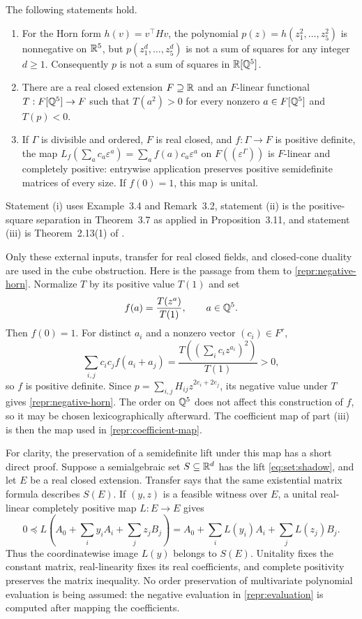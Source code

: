 \begin{lemma}
\label{repr:bkt-input}
The following statements hold.
\begin{enumerate}[label=(\roman*)]
\item For the Horn form $h(v)=v^\top Hv$, the polynomial
      $p(z)=h(z_1^2,\ldots,z_5^2)$ is nonnegative on $\mathbb R^5$, but
      $p(z_1^d,\ldots,z_5^d)$ is not a sum of squares for any integer $d\geq1$.
      Consequently $p$ is not a sum of squares in $\mathbb R[\mathbb Q^5]$.
\item There are a real closed extension $F\supseteq\mathbb R$ and an $F$-linear
      functional $T:F[\mathbb Q^5]\to F$ such that $T(a^2)>0$ for every nonzero
      $a\in F[\mathbb Q^5]$ and $T(p)<0$.
\item If $\Gamma$ is divisible and ordered, $F$ is real closed, and
      $f:\Gamma\to F$ is positive definite, the map
      $L_f(\sum_a c_a\varepsilon^a)=\sum_a f(a)c_a\varepsilon^a$ on
      $F((\varepsilon^\Gamma))$ is $F$-linear and completely positive:
      entrywise application preserves positive semidefinite matrices of
      every size. If $f(0)=1$, this map is unital.
\end{enumerate}
Statement (i) uses Example~3.4 and Remark~3.2, statement (ii) is the
positive-square separation in Theorem~3.7 as applied in Proposition~3.11,
and statement (iii) is Theorem~2.13(1) of
\citet{BodirskyKummerThom2024}.
\end{lemma}

Only these external inputs, transfer for real closed fields, and closed-cone
duality are used in the cube obstruction. Here is the passage from them to
\eqref{repr:negative-horn}. Normalize $T$ by its positive value $T(1)$ and set
\[
 f(a)=\frac{T(z^a)}{T(1)},\qquad a\in\mathbb Q^5.
\]
Then $f(0)=1$. For distinct $a_i$ and a nonzero vector $(c_i)\in F^r$,
\[
 \sum_{i,j}c_ic_j f(a_i+a_j)
 =\frac{T((\sum_i c_i z^{a_i})^2)}{T(1)}>0,
\]
so $f$ is positive definite. Since
$p=\sum_{i,j}H_{ij}z^{2e_i+2e_j}$, its negative value under $T$ gives
\eqref{repr:negative-horn}. The order on $\mathbb Q^5$ does not affect this
construction of $f$, so it may be chosen lexicographically afterward.
The coefficient map of part (iii) is then the map used in
\eqref{repr:coefficient-map}.

For clarity, the preservation of a semidefinite lift under this map has a
short direct proof. Suppose a semialgebraic set $S\subseteq\mathbb R^d$ has the
lift \eqref{eq:set:shadow}, and let $E$ be a real closed extension. Transfer
says that the same existential matrix formula describes $S(E)$. If
$(y,z)$ is a feasible witness over $E$, a unital real-linear completely
positive map $L:E\to E$ gives
\[
 0\preceq L\left(A_0+\sum_i y_iA_i+\sum_j z_jB_j\right)
 =A_0+\sum_i L(y_i)A_i+\sum_j L(z_j)B_j.
\]
Thus the coordinatewise image $L(y)$ belongs to $S(E)$. Unitality fixes the
constant matrix, real-linearity fixes its real coefficients, and complete
positivity preserves the matrix inequality. No order preservation of
multivariate polynomial evaluation is being assumed: the negative
evaluation in \eqref{repr:evaluation} is computed after mapping the
coefficients.

